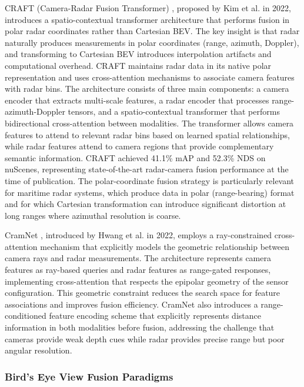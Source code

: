 CRAFT (Camera-Radar Fusion Transformer) \cite{Kim2022CRAFT}, proposed by Kim et al. in 2022, introduces a spatio-contextual transformer architecture that performs fusion in polar radar coordinates rather than Cartesian BEV. The key insight is that radar naturally produces measurements in polar coordinates (range, azimuth, Doppler), and transforming to Cartesian BEV introduces interpolation artifacts and computational overhead. CRAFT maintains radar data in its native polar representation and uses cross-attention mechanisms to associate camera features with radar bins. The architecture consists of three main components: a camera encoder that extracts multi-scale features, a radar encoder that processes range-azimuth-Doppler tensors, and a spatio-contextual transformer that performs bidirectional cross-attention between modalities. The transformer allows camera features to attend to relevant radar bins based on learned spatial relationships, while radar features attend to camera regions that provide complementary semantic information. CRAFT achieved 41.1\% mAP and 52.3\% NDS on nuScenes, representing state-of-the-art radar-camera fusion performance at the time of publication. The polar-coordinate fusion strategy is particularly relevant for maritime radar systems, which produce data in polar (range-bearing) format and for which Cartesian transformation can introduce significant distortion at long ranges where azimuthal resolution is coarse.

CramNet \cite{Hwang2022CramNet}, introduced by Hwang et al. in 2022, employs a ray-constrained cross-attention mechanism that explicitly models the geometric relationship between camera rays and radar measurements. The architecture represents camera features as ray-based queries and radar features as range-gated responses, implementing cross-attention that respects the epipolar geometry of the sensor configuration. This geometric constraint reduces the search space for feature associations and improves fusion efficiency. CramNet also introduces a range-conditioned feature encoding scheme that explicitly represents distance information in both modalities before fusion, addressing the challenge that cameras provide weak depth cues while radar provides precise range but poor angular resolution.



\subsubsection{Bird's Eye View Fusion Paradigms}

